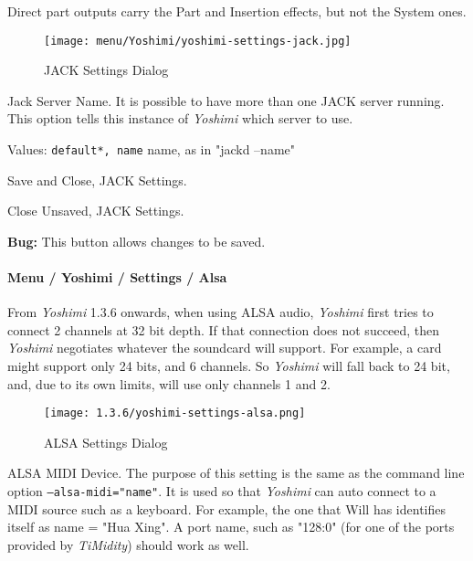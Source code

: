    Direct part outputs carry the Part and Insertion effects, but not the
   System ones.

\begin{figure}[H]
   \centering 
   \texttt{[image: menu/Yoshimi/yoshimi-settings-jack.jpg]}
   \caption[JACK Settings]{JACK Settings Dialog}
   \label{fig:yoshimi_settings_jack}
\end{figure}

   \setcounter{ItemCounter}{0}      %

   Jack Server Name.
   It is possible to have more than one JACK server running.  This option
   tells this instance of \textsl{Yoshimi} which server to use.

   Values: \texttt{default*, name} name, as in "jackd --name"

   Save and Close, JACK Settings.

   Close Unsaved, JACK Settings.

   \textbf{Bug:}
   This button allows changes to be saved.

\paragraph{Menu / Yoshimi / Settings / Alsa}
\label{paragraph:menu_yoshimi_settings_alsa}

   From \textsl{Yoshimi} 1.3.6 onwards, when using ALSA audio,
   \textsl{Yoshimi} first tries to connect 2 channels at 32 bit depth.  If
   that connection does not succeed, then \textsl{Yoshimi} negotiates
   whatever the soundcard will support.  For example, a card might support
   only 24 bits, and 6 channels.  So \textsl{Yoshimi} will fall back to
   24 bit, and, due to its own limits, will use only channels 1 and 2.

\begin{figure}[H]
   \centering 
   \texttt{[image: 1.3.6/yoshimi-settings-alsa.png]}
   \caption[ALSA Settings]{ALSA Settings Dialog}
   \label{fig:yoshimi_settings_alsa}
\end{figure}

   \setcounter{ItemCounter}{0}      %

   ALSA MIDI Device.
   The purpose of this setting is the same as the command line option
   \texttt{--alsa-midi="name"}.
   It is used so that \textsl{Yoshimi} can auto connect to a MIDI source
   such as a keyboard.  For example, the one that Will has identifies itself
   as name = "Hua Xing".
   A port name, such as "128:0" (for one of the ports provided by
   \textsl{TiMidity}) should work as well.

